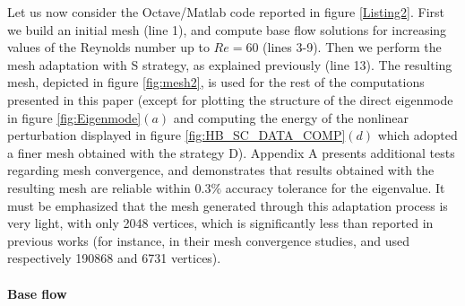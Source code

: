 \documentclass[twocolumn,10pt]{asme2ej}
\begin{document}
Let us now consider the Octave/Matlab code reported in figure \ref{Listing2}. First we build an initial mesh (line 1), and compute base flow solutions for increasing values of the Reynolds number up to $Re = 60$ (lines 3-9).
Then we perform the mesh adaptation with S strategy, as explained previously (line 13).
The resulting mesh, depicted in figure \ref{fig:mesh2}, is used for the rest of the computations presented in this paper (except for plotting the structure of the direct eigenmode in figure \ref{fig:Eigenmode}$(a)$ and computing the energy of the nonlinear perturbation displayed in figure \ref{fig:HB_SC_DATA_COMP}$(d)$ which adopted a finer mesh obtained with the strategy D). 
Appendix A presents additional tests regarding mesh convergence, and demonstrates that results obtained with the resulting mesh are reliable within $0.3\%$ accuracy tolerance for the eigenvalue. It must be emphasized  that the mesh generated through this adaptation process is very light, with only 2048 vertices, which is significantly less than reported in previous works (for instance, in their mesh convergence studies, \cite{SippLebedev} and \cite{MLugo2014} used respectively 190868  and 6731 vertices).










\paragraph{Base flow}
\end{document}

